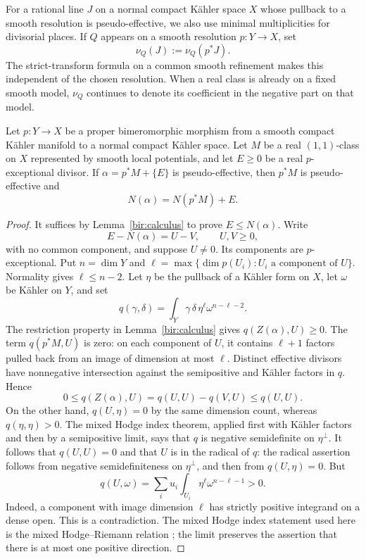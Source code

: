 For a rational line \(J\) on a normal compact Kähler space \(X\) whose pullback
to a smooth resolution is pseudo-effective, we also use minimal
multiplicities for divisorial places. If \(Q\) appears on a smooth
resolution \(p:Y\to X\), set
\[
 \nu_Q(J):=\nu_Q(p^*J).
\]
The strict-transform formula on a common smooth refinement makes this
independent of the chosen resolution. When a real class is already on a
fixed smooth model, \(\nu_Q\) continues to denote its coefficient in the
negative part on that model.

\begin{lemma}\label{bir:exceptional}
Let \(p:Y\to X\) be a proper bimeromorphic morphism from a smooth compact
Kähler manifold to a normal compact Kähler space. Let \(M\) be a real
\((1,1)\)-class on \(X\) represented by smooth local potentials, and let
\(E\geq0\) be a real \(p\)-exceptional divisor. If
\(\alpha=p^*M+\{E\}\) is pseudo-effective, then \(p^*M\) is
pseudo-effective and
\[
 N(\alpha)=N(p^*M)+E.
\]
\end{lemma}

\begin{proof}
It suffices by Lemma~\ref{bir:calculus} to prove \(E\leq N(\alpha)\).
Write
\[
 E-N(\alpha)=U-V,
 \qquad U,V\geq0,
\]
with no common component, and suppose \(U\neq0\). Its components are
\(p\)-exceptional. Put \(n=\dim Y\) and
\(\ell=\max\{\dim p(U_i):U_i\text{ a component of }U\}\). Normality
gives \(\ell\leq n-2\). Let \(\eta\) be the pullback of a Kähler form
on \(X\), let \(\omega\) be Kähler on \(Y\), and set
\[
 q(\gamma,\delta)=
 \int_Y\gamma\,\delta\,\eta^{\ell}\omega^{n-\ell-2}.
\]
The restriction property in Lemma~\ref{bir:calculus} gives
\(q(Z(\alpha),U)\geq0\). The term \(q(p^*M,U)\) is zero: on each
component of \(U\), it contains \(\ell+1\) factors pulled back from an
image of dimension at most \(\ell\). Distinct effective divisors have
nonnegative intersection against the semipositive and Kähler factors in
\(q\). Hence
\[
 0\leq q(Z(\alpha),U)=q(U,U)-q(V,U)\leq q(U,U).
\]
On the other hand, \(q(U,\eta)=0\) by the same dimension count, whereas
\(q(\eta,\eta)>0\). The mixed Hodge index theorem, applied first with
Kähler factors and then by a semipositive limit, says that \(q\) is
negative semidefinite on \(\eta^\perp\). It follows that \(q(U,U)=0\)
and that \(U\) is in the radical of \(q\): the radical assertion follows
from negative semidefiniteness on \(\eta^\perp\), and then from
\(q(U,\eta)=0\). But
\[
 q(U,\omega)=\sum_i u_i\int_{U_i}
       \eta^{\ell}\omega^{n-\ell-1}>0.
\]
Indeed, a component with image dimension \(\ell\) has strictly positive
integrand on a dense open. This is a contradiction. The mixed Hodge index
statement used here is the mixed Hodge--Riemann relation
\cite[Theorems~A and~C]{DinhNguyen}; the limit preserves the assertion that
there is at most one positive direction.
\end{proof}

